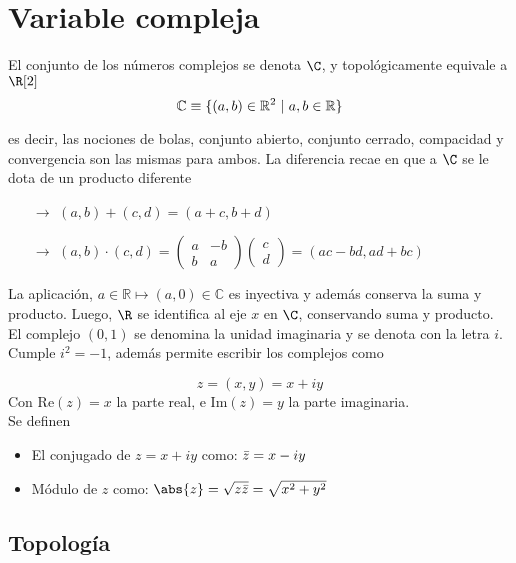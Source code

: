 \section{Variable compleja}
El conjunto de los números complejos se denota $\C$, y topológicamente equivale a $\R[2]$
\[ \mathbb{C} \equiv \{ (a,b) \in \mathbb{R}^2 \hspace{3px} | \hspace{3px}  a,b \in \mathbb{R} \} \]

es decir, las nociones de bolas, conjunto abierto, conjunto cerrado, compacidad y convergencia son las mismas para ambos. La diferencia recae en que a $\C$ se le dota de un producto diferente
\begin{itemize}
    \item[$\to$] $(a,b)+(c,d)=(a+c,b+d)$
    \item[$\to$] $(a,b)\cdot(c,d) = \begin{pmatrix}a&-b\\b&a\end{pmatrix}\begin{pmatrix}c\\d\end{pmatrix} = (ac-bd,ad+bc)$
\end{itemize}


La aplicación, $a \in \mathbb{R} \mapsto (a,0) \in \mathbb{C}$ es inyectiva y además conserva la suma y producto. Luego, $\R$ se identifica al eje $x$ en $\C$, conservando suma y producto.\\

El complejo $(0,1)$ se denomina la unidad imaginaria y se denota con la letra $i$. Cumple $i^2 = -1$, además permite escribir los complejos como

\[z = (x,y) = x + iy\]
Con $\mathrm{Re}(z) = x$ la parte real, e $\mathrm{Im}(z)=y$ la parte imaginaria.\\

\noindent 
Se definen
\begin{itemize}
    \item El conjugado de $z = x + iy$ como: $\Bar{z} = x-iy$ 
    \item Módulo de $z$ como: $\abs{z} = \sqrt{z\Bar{z}} = \sqrt{x^2 + y^2}$
\end{itemize}

\subsection{Topología}

